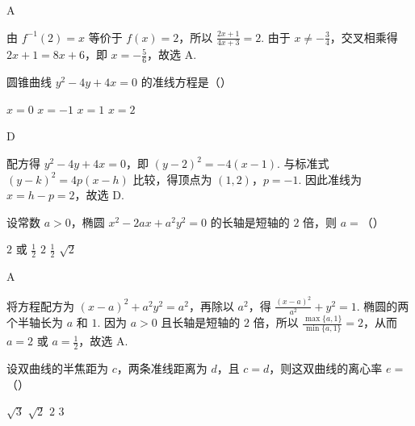 \documentclass[UTF8,a4paper,oneside,11pt]{ctexbook}
\begin{document}
\begin{answer}
A
\end{answer}

\begin{solution}
由 \(f^{-1}(2)=x\) 等价于 \(f(x)=2\)，所以
\(\frac{2x+1}{4x+3}=2\). 由于 \(x\neq-\frac{3}{4}\)，交叉相乘得 \(2x+1=8x+6\)，即 \(x=-\frac{5}{6}\)，故选 A.
\end{solution}

\begin{problem}

圆锥曲线 \(y^{2}-4y+4x=0 \) 的准线方程是（\quad）

\choices
{\(x=0\)}
{\(x=-1\)}
{\(x=1\)}
{\(x=2\)}
\end{problem}

\begin{answer}
D
\end{answer}

\begin{solution}
配方得 \(y^{2}-4y+4x=0\)，即 \((y-2)^{2}=-4(x-1)\). 与标准式 \((y-k)^{2}=4p(x-h)\) 比较，得顶点为 \((1,2)\)，\(p=-1\). 因此准线为 \(x=h-p=2\)，故选 D.
\end{solution}

\begin{problem}

设常数 \(a>0\)，椭圆 \(x^{2} - 2ax + a^{2}y^{2} = 0\) 的长轴是短轴的 \(2\) 倍，则 \(a=\)（\quad）

\choices
{\(2\) 或 \(\frac{1}{2}\)}
{\(2\)}
{\(\frac{1}{2}\)}
{\(\sqrt{2}\)}
\end{problem}

\begin{answer}
A
\end{answer}

\begin{solution}
将方程配方为 \((x-a)^{2}+a^{2}y^{2}=a^{2}\)，再除以 \(a^{2}\)，得
\(\frac{(x-a)^{2}}{a^{2}}+y^{2}=1\). 椭圆的两个半轴长为 \(a\) 和 \(1\). 因为 \(a>0\) 且长轴是短轴的 \(2\) 倍，所以
\(\frac{\max\{a,1\}}{\min\{a,1\}}=2\)，从而 \(a=2\) 或 \(a=\frac{1}{2}\)，故选 A.
\end{solution}

\begin{problem}

设双曲线的半焦距为 \(c\)，两条准线距离为 \(d\)，且 \(c=d\)，则这双曲线的离心率 \(e=\)（\quad）

\choices
{\(\sqrt{3}\)}
{\(\sqrt{2}\)}
{\(2\)}
{\(3\)}
\end{problem}
\end{document}
